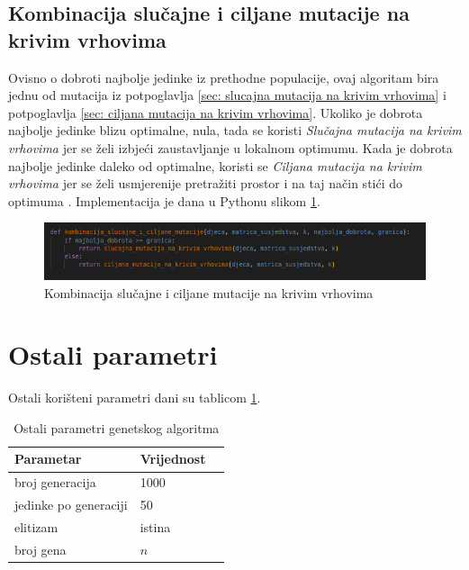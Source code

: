 \documentclass[times, utf8, zavrsni, numeric]{fer}
\begin{document}
\subsection{Kombinacija slučajne i ciljane mutacije na krivim vrhovima}
\label{sec: kombinacija slucajne i ciljane mutacije na krivim vrhovima}
Ovisno o dobroti najbolje jedinke iz prethodne populacije, ovaj algoritam bira jednu od mutacija iz potpoglavlja \ref{sec: slucajna mutacija na krivim vrhovima} i potpoglavlja \ref{sec: ciljana mutacija na krivim vrhovima}. Ukoliko je dobrota najbolje jedinke blizu optimalne, nula, tada se koristi \textit{Slučajna mutacija na krivim vrhovima} jer se želi izbjeći zaustavljanje u lokalnom optimumu. Kada je dobrota najbolje jedinke daleko od optimalne, koristi se \textit{Ciljana mutacija na krivim vrhovima} jer se želi usmjerenije pretražiti prostor i na taj način stići do optimuma \cite{hindi2012genetic}. Implementacija je dana u Pythonu slikom \ref{fig:kombinacija slucajen i ciljane mutacije}.

\begin{figure}[htb]
\centering
\includegraphics[width=14cm]{images/kombinacija_slucajne_i_ciljane_mutacije.png}
\caption{Kombinacija slučajne i ciljane mutacije na krivim vrhovima}
\label{fig:kombinacija slucajen i ciljane mutacije}
\end{figure}

\section{Ostali parametri}
Ostali korišteni parametri dani su tablicom \ref{tbl:ostali parametri genetrskog algoritma}.

\begin{table}[htb]
\caption{Ostali parametri genetskog algoritma}
\label{tbl:ostali parametri genetrskog algoritma}
\centering
\begin{tabular}{llr} \hline
Parametar & Vrijednost\\ \hline
broj generacija & 1000 \\
jedinke po generaciji & 50 \\
elitizam & istina \\
broj gena & $n$ \\ \hline
\end{tabular}
\end{table}
\end{document}
